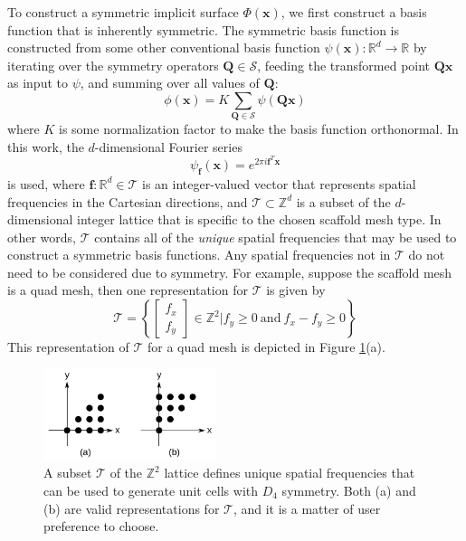 \documentclass[acmtog]{acmart}
\begin{document}
To construct a symmetric implicit surface $\Phi(\mathbf{x})$, we first construct a basis function that is inherently symmetric. The symmetric basis function is constructed from some other conventional basis function $\psi(\mathbf{x}): \mathbb{R}^d \rightarrow \mathbb{R}$ by iterating over the symmetry operators $\mathbf{Q} \in \mathcal{S}$, feeding the transformed point $\mathbf{Qx}$ as input to $\psi$, and summing over all values of $\mathbf{Q}$:
%
\begin{equation}
  \label{eq:basis_function}
  \phi(\mathbf{x}) = K \sum\limits_{\mathbf{Q} \in \mathcal{S}} \psi(\mathbf{Qx})
\end{equation}
%
where $K$ is some normalization factor to make the basis function orthonormal. In this work, the $d$-dimensional Fourier series
%
\begin{equation}
  \label{eq:fourier_series}
  \psi_{\mathbf{f}}(\mathbf{x}) = e^{2\pi i \mathbf{f}^T \mathbf{x}}
\end{equation}
%
is used, where $\mathbf{f}: \mathbb{R}^d \in \mathcal{T}$ is an integer-valued vector that represents spatial frequencies in the Cartesian directions, and $\mathcal{T} \subset \mathbb{Z}^d$ is a subset of the $d$-dimensional integer lattice that is specific to the chosen scaffold mesh type. In other words, $\mathcal{T}$ contains all of the \textit{unique} spatial frequencies that may be used to construct a symmetric basis functions. Any spatial frequencies not in $\mathcal{T}$ do not need to be considered due to symmetry. For example, suppose the scaffold mesh is a quad mesh, then one representation for $\mathcal{T}$ is given by
%
\begin{equation}
  \mathcal{T} = \left\{ \begin{bmatrix} f_x \\ f_y \end{bmatrix} \in \mathbb{Z}^2 | f_y \geq 0 \: \text{and} \: f_x - f_y \geq 0 \right\}
\end{equation}
%
This representation of $\mathcal{T}$ for a quad mesh is depicted in Figure \ref{fig:unique_freqs_quad}(a).
%
\begin{figure}
  \centering
  \includegraphics[width=0.45\textwidth]{figures/quad_z_lattice_points.pdf}
  \caption{A subset $\mathcal{T}$ of the $\mathbb{Z}^2$ lattice defines unique spatial frequencies that can be used to generate unit cells with $D_4$ symmetry. Both (a) and (b) are valid representations for $\mathcal{T}$, and it is a matter of user preference to choose.}
  \label{fig:unique_freqs_quad}
\end{figure}
\end{document}

